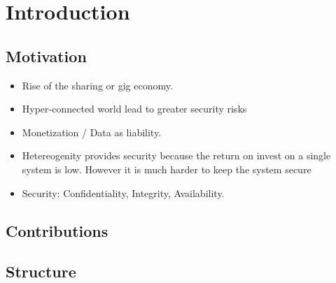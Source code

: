 \chapter{Introduction}
\label{sec:introduction}

\section{Motivation}

\begin{itemize}
\item Rise of the sharing or gig economy. 
\item Hyper-connected world lead to greater security risks
\item Monetization / Data as liability.
\item Hetereogenity provides security because the return on invest on a single system is low. However it is much harder to keep the system secure
\item Security: Confidentiality, Integrity, Availability.

\end{itemize}


\section{Contributions}


\section{Structure}
